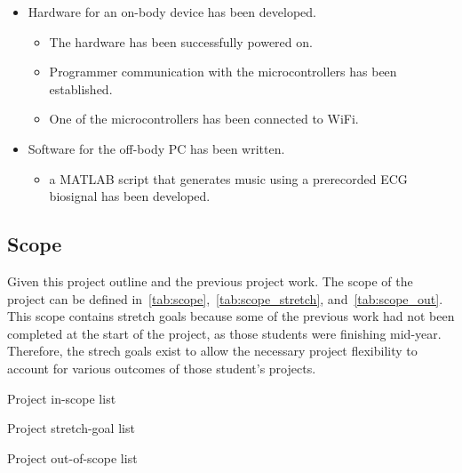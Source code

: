 \begin{itemize}
        \item Hardware for an on-body device has been developed.
        \begin{itemize}
                \item The hardware has been successfully powered on.
                \item Programmer communication with the microcontrollers has been established.
                \item One of the microcontrollers has been connected to WiFi.
        \end{itemize}
        \item Software for the off-body PC has been written.
        \begin{itemize}
                \item a MATLAB script that generates music using a prerecorded ECG biosignal has been developed.
        \end{itemize}
\end{itemize}

\subsection{Scope}
Given this project outline and the previous project work.
The scope of the project can be defined in~\autoref{tab:scope},~\autoref{tab:scope_stretch}, and~\autoref{tab:scope_out}.
This scope contains stretch goals because some of the previous work had not been completed at the start of the project,
as those students were finishing mid-year.
Therefore, the strech goals exist to allow the necessary project flexibility to account for various outcomes of those student's projects.

\begin{table}[!ht]
    \caption{Project in-scope list}\label{tab:scope}
    \centering
    
\end{table}

\begin{table}[!ht]
    \caption{Project stretch-goal list}\label{tab:scope_stretch}
    \centering
    
\end{table}

\begin{table}[!ht]
    \caption{Project out-of-scope list}\label{tab:scope_out}
    \centering
    
\end{table}
